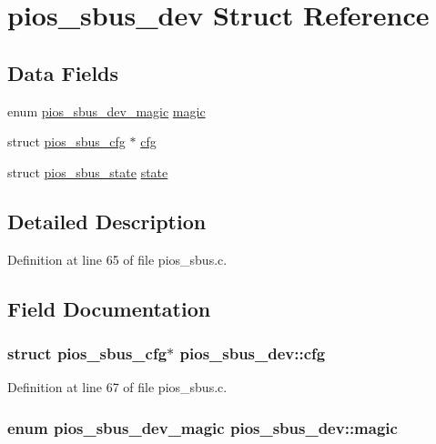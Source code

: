 \hypertarget{structpios__sbus__dev}{\section{pios\-\_\-sbus\-\_\-dev \-Struct \-Reference}
\label{structpios__sbus__dev}
}
\subsection*{\-Data \-Fields}
\begin{DoxyCompactItemize}
\item 
enum \hyperlink{group___p_i_o_s___s_bus_ga595ee1f903af9c4166426f9cc144b36c}{pios\-\_\-sbus\-\_\-dev\-\_\-magic} \hyperlink{structpios__sbus__dev_a7cc93108060c6f0d89153b5fff91e8a3}{magic}
\item 
struct \hyperlink{structpios__sbus__cfg}{pios\-\_\-sbus\-\_\-cfg} $\ast$ \hyperlink{structpios__sbus__dev_a6849c60224852efbaed85e91a3008d62}{cfg}
\item 
struct \hyperlink{structpios__sbus__state}{pios\-\_\-sbus\-\_\-state} \hyperlink{structpios__sbus__dev_aeddc0c60e673c21f9c666cc8134935ee}{state}
\end{DoxyCompactItemize}


\subsection{\-Detailed \-Description}


\-Definition at line 65 of file pios\-\_\-sbus.\-c.



\subsection{\-Field \-Documentation}
\hypertarget{structpios__sbus__dev_a6849c60224852efbaed85e91a3008d62}{
\subsubsection[{cfg}]{\setlength{\rightskip}{0pt plus 5cm}struct {\bf pios\-\_\-sbus\-\_\-cfg}$\ast$ {\bf pios\-\_\-sbus\-\_\-dev\-::cfg}}}\label{structpios__sbus__dev_a6849c60224852efbaed85e91a3008d62}


\-Definition at line 67 of file pios\-\_\-sbus.\-c.

\hypertarget{structpios__sbus__dev_a7cc93108060c6f0d89153b5fff91e8a3}{
\subsubsection[{magic}]{\setlength{\rightskip}{0pt plus 5cm}enum {\bf pios\-\_\-sbus\-\_\-dev\-\_\-magic} {\bf pios\-\_\-sbus\-\_\-dev\-::magic}}}\label{structpios__sbus__dev_a7cc93108060c6f0d89153b5fff91e8a3}


